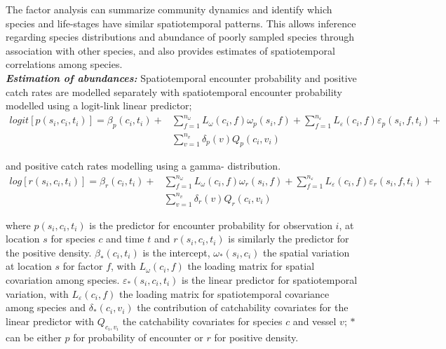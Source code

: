 \documentclass[fleqn,10pt]{wlscirep}
\begin{document}
\begin{linenumbers}
The factor analysis can summarize community dynamics and identify which species
and life-stages have similar spatiotemporal patterns. This allows inference
regarding species distributions and abundance of poorly sampled species through
association with other species, and also provides estimates of spatiotemporal
correlations among species\cite{Thorson2016b}.\\

\textbf{\textit{Estimation of abundances:}} Spatiotemporal encounter
probability and positive catch rates are modelled separately with
spatiotemporal encounter probability modelled using a logit-link linear
predictor;
		\begin{equation}
			\begin{split}
			logit[p(s_{i},c_{i},t_{i})] =	\beta_{p}(c_{i},t_{i}) +
			& \sum\limits_{f=1}^{n_{\omega}} L_{\omega}(c_{i},f)
			\omega_{p}(s_{i},f) + \sum\limits_{f=1}^{n_{\varepsilon}}
			L_{\varepsilon}(c_{i},f) \varepsilon_{p}(s_{i},f,t_{i}) + \\ 
			& \sum\limits_{v=1}^{n_{v}}\delta_{p}(v)Q_{p}(c_{i}, v_{i})
		\end{split}
		\end{equation}

and positive catch rates modelling using a gamma- distribution\cite{Thorson2015a}. 
		\begin{equation}
			\begin{split}
			log[r(s_{i},c_{i},t_{i})] = \beta_{r}(c_{i},t_{i}) +
			& \sum\limits_{f=1}^{n_{\omega}} L_{\omega}(c_{i},f)
			\omega_{r}(s_{i},f) +\sum\limits_{f=1}^{n_{\varepsilon}} 
			L_{\varepsilon}(c_{i},f) \varepsilon_{r}(s_{i},f,t_{i}) + \\
			& \sum\limits_{v=1}^{n_{v}}\delta_{r}(v) Q_{r}(c_{i}, v_{i})
			\end{split}
		\end{equation}

where $p(s_{i}, c_{i}, t_{i})$ is the predictor for encounter probability for
observation $i$, at location $s$ for species $c$ and time $t$ and $r(s_{i},
c_{i}, t_{i})$ is similarly the predictor for the positive density.
$\beta_{*}(c_{i},t_{i})$ is the intercept, $\omega_{*}(s_{i},c_{i})$ the
spatial variation at location $s$ for factor $f$, with $L_{\omega}(c_{i},f)$
the loading matrix for spatial covariation among species.
$\varepsilon_{*}(s_{i},c_{i},t_{i})$ is the linear predictor for spatiotemporal
variation, with $L_{\varepsilon}(c_{i}, f)$ the loading matrix for
spatiotemporal covariance among species and $\delta_{*}(c_{i}, v_{i})$ the
contribution of catchability covariates for the linear predictor with
$Q_{c_{i}, v_{i}}$ the catchability covariates for species $c$ and vessel $v$;
$*$ can be either $p$ for probability of encounter or $r$ for positive
density.\\


\end{linenumbers}
\end{document}
